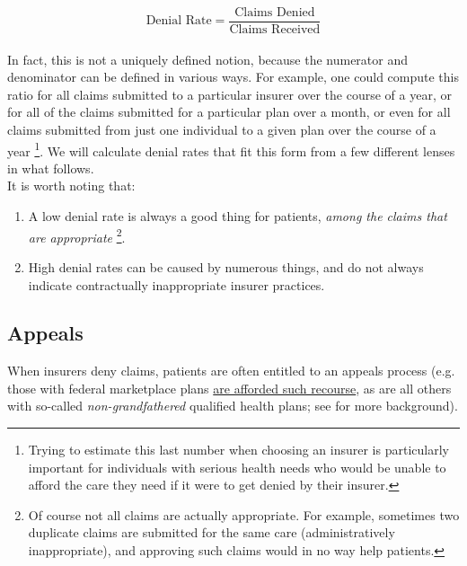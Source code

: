 \documentclass[12pt, a4paper]{report}
\begin{document}
\begin{equation*}
	\text{Denial Rate} = \dfrac{\text{Claims Denied}}{\text{Claims Received}}
\end{equation*}
\hfill\\
In fact, this is not a uniquely defined notion, because the numerator and denominator can be defined in various ways. For example, one could compute this ratio for all claims submitted to a particular insurer over the course of a year, or for all of the claims submitted for a particular plan over a month, or even for all claims submitted from just one individual to a given plan over the course of a year \footnote{Trying to estimate this last number when choosing an insurer is particularly important for individuals with serious health needs who would be unable to afford the care they need if it were to get denied by their insurer.}. We will calculate denial rates that fit this form from a few different lenses in what follows.\\

It is worth noting that:

\begin{enumerate}
\item A low denial rate is always a good thing for patients, \emph{among the claims that are appropriate} \footnote{Of course not all claims are actually appropriate. For example, sometimes two duplicate claims are submitted for the same care (administratively inappropriate), and approving such claims would in no way help patients. }.
\item High denial rates can be caused by numerous things, and do not always indicate contractually inappropriate insurer practices.
\end{enumerate}


\subsection{Appeals}

When insurers deny claims, patients are often entitled to an appeals process (e.g. those with federal marketplace plans \href{https://www.healthcare.gov/appeal-insurance-company-decision/appeals/}{are afforded such recourse}, as are all others with so-called \emph{non-grandfathered} qualified health plans; see \cite{pollitz2021} for more background).\\
\end{document}
